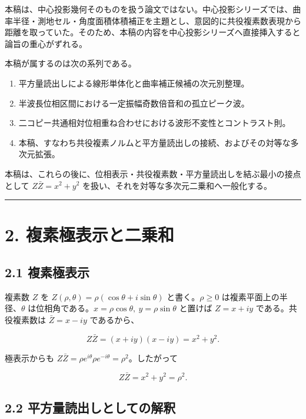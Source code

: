 \documentclass[11pt,a4paper]{ltjsarticle}
\providecommand{\tightlist}{\setlength{\itemsep}{0pt}\setlength{\parskip}{0pt}}
\begin{document}
本稿は、中心投影幾何そのものを扱う論文ではない。中心投影シリーズでは、曲率半径・測地セル・角度面積体積補正を主題とし、意図的に共役複素数表現から距離を取っていた。そのため、本稿の内容を中心投影シリーズへ直接挿入すると論旨の重心がずれる。

本稿が属するのは次の系列である。

\begin{enumerate}
\def\labelenumi{\arabic{enumi}.}
\tightlist
\item
  平方量読出しによる線形単体化と曲率補正候補の次元別整理。
\item
  半波長位相区間における一定振幅奇数倍音和の孤立ピーク波。
\item
  二コピー共通相対位相重ね合わせにおける波形不変性とコントラスト則。
\item
  本稿、すなわち共役複素ノルムと平方量読出しの接続、およびその対等な多次元拡張。
\end{enumerate}

本稿は、これらの後に、位相表示・共役複素数・平方量読出しを結ぶ最小の接点として
\(Z\bar Z=x^2+y^2\) を扱い、それを対等な多次元二乗和へ一般化する。

\begin{center}\rule{0.5\linewidth}{0.5pt}\end{center}

\section{2.
複素極表示と二乗和}\label{ux8907ux7d20ux6975ux8868ux793aux3068ux4e8cux4e57ux548c}

\subsection{2.1 複素極表示}\label{ux8907ux7d20ux6975ux8868ux793a}

複素数 \(Z\) を \(Z(\rho,\theta)=\rho(\cos\theta+i\sin\theta)\)
と書く。\(\rho\ge0\) は複素平面上の半径、\(\theta\)
は位相角である。\(x=\rho\cos\theta,\ y=\rho\sin\theta\) と置けば
\(Z=x+iy\) である。共役複素数は \(\bar Z=x-iy\) であるから、

\[
Z\bar Z=(x+iy)(x-iy)=x^2+y^2 .
\]

極表示からも
\(Z\bar Z=\rho e^{i\theta}\rho e^{-i\theta}=\rho^2\)。したがって

\[
Z\bar Z=x^2+y^2=\rho^2 .
\]

\subsection{2.2
平方量読出しとしての解釈}\label{ux5e73ux65b9ux91cfux8aadux51faux3057ux3068ux3057ux3066ux306eux89e3ux91c8}
\end{document}
